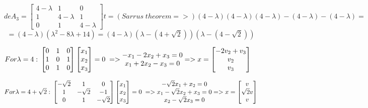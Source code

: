 \documentclass[eng,openany]{mgr}
\begin{document}
\[
de
A_3 =
\begin{bmatrix}
4-\lambda & 1 & 0  \\
1 & 4-\lambda & 1 \\
0 & 1 & 4-\lambda 
\end{bmatrix}t
= (Sarrus\;theorem =>)(4-\lambda)(4-\lambda)(4-\lambda)- (4-\lambda) - (4-\lambda) = 
\]
\[
= (4-\lambda)(\lambda^2 - 8 \lambda + 14) = (4-\lambda)(\lambda - (4+\sqrt{2}))(\lambda - (4-\sqrt{2}))
\]

\begin{math}
For \lambda = 4:\\
\begin{bmatrix}
0 & 1 & 0  \\
1 & 0 & 1 \\
0 & 1 & 0 
\end{bmatrix}
\begin{bmatrix}
x_1 \\
x_2 \\
x_3
\end{bmatrix}
= 0\; =>
\begin{matrix}
-x_1 -2x_2+x_3 = 0\\
x_1+2x_2-x_3 = 0\\

\end{matrix}
=>
x = 
\begin{bmatrix}
-2v_2+v_3\\
v_2 \\
v_3
\end{bmatrix}
\end{math}

\begin{math}
For \lambda = 4+\sqrt{2}:\\
\begin{bmatrix}
-\sqrt{2} & 1 & 0  \\
1 & -\sqrt{2} & -1 \\
0 & 1 & -\sqrt{2} 
\end{bmatrix}
\begin{bmatrix}
x_1 \\
x_2 \\
x_3
\end{bmatrix}
= 0\; =>
\begin{matrix}
-\sqrt2x_1 +x_2 = 0\\
x_1-\sqrt2x_2+x_3 = 0\\
x_2-\sqrt2x_3=0
\end{matrix}
=>
x = 
\begin{bmatrix}
v\\
\sqrt2v \\
v
\end{bmatrix}
\end{math}
\end{document}
